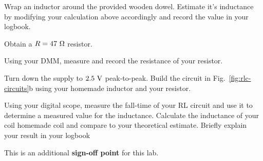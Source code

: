\begin{measurement}
Wrap an inductor around the provided wooden dowel. Estimate it's
inductance by modifying your calculation above accordingly and record
the value in your logbook.
\end{measurement}

Obtain a $R=47~\rm \Omega$ resistor.
\begin{measurement}
Using your DMM, measure and record the resistance of your resistor.
\end{measurement}

Turn down the supply to $2.5~\rm V$ peak-to-peak.  Build the
circuit in Fig.~\ref{fig:rlc-circuits}b using your homemade inductor
and your resistor.

\begin{measurement}
Using your digital scope, measure the fall-time of your RL circuit and
use it to determine a measured value for the inductance.  Calculate
the inductance of your coil homemade coil and compare to your
theoretical estimate.  Briefly explain your result in your logbook
\end{measurement}

This is an additional \textbf{sign-off point} for this lab.

